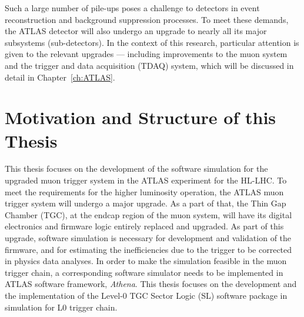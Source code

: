 Such a large number of pile-ups poses a challenge to detectors in event reconstruction and background suppression processes. To meet these demands, the ATLAS detector will also undergo an upgrade to nearly all its major subsystems (sub-detectors). In the context of this research, particular attention is given to the relevant upgrades — including improvements to the muon system and the trigger and data acquisition (TDAQ) system, which will be discussed in detail in Chapter~\ref{ch:ATLAS}.

\section{Motivation and Structure of this Thesis} \label{sec:motivation}
This thesis focuses on the development of the software simulation for the upgraded muon trigger system in the ATLAS experiment for the HL-LHC. To meet the requirements for the higher luminosity operation, the ATLAS muon trigger system will undergo a major upgrade. As a part of that, the Thin Gap Chamber (TGC), at the endcap region of the muon system, will have its digital electronics and firmware logic entirely replaced and upgraded. As part of this upgrade, software simulation is necessary for development and validation of the firmware, and for estimating the inefficiencies due to the trigger to be corrected in physics data analyses. In order to make the simulation feasible in the muon trigger chain, a corresponding software simulator needs to be implemented in ATLAS software framework, \textit{Athena}. This thesis focuses on the development and the implementation of the Level-0 TGC Sector Logic (SL) software package in simulation for L0 trigger chain.

